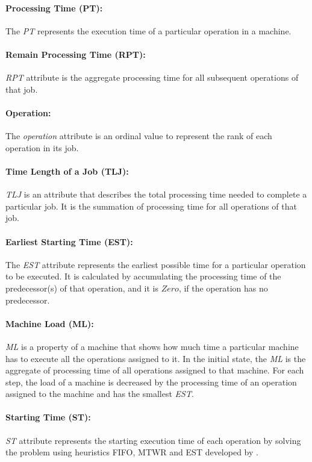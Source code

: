 \documentclass[runningheads]{llncs}
\begin{document}
\paragraph{Processing Time (PT):}
The \textit{PT} represents the execution time of a particular operation in a machine.

\paragraph{Remain Processing Time (RPT):}
\textit{RPT} attribute is the aggregate processing time for all subsequent operations of that job.

\paragraph{Operation:}
The \textit{operation} attribute is an ordinal value to represent the rank of each operation in its job.

\paragraph{Time Length of a Job (TLJ):}
\textit{TLJ} is an attribute that describes the total processing time needed to complete a particular job. It is the summation of processing time for all operations of that job.

\paragraph{Earliest Starting Time (EST):}
The \textit{EST} attribute represents the earliest possible time for a particular operation to be executed. It is calculated by accumulating the processing time of the predecessor(s) of that operation, and it is $Zero$, if the operation has no predecessor.

\paragraph{{Machine Load} (ML):}
\textit{ML} is a property of a machine that shows how much time a particular machine has to execute all the operations assigned to it. In the initial state, the \textit{ML} is the aggregate of processing time of all operations assigned to that machine. For each step, the load of a machine is decreased by the processing time of an operation assigned to the machine and has the smallest \textit{EST}.

\paragraph{{Starting Time} (ST):}
\textit{ST} attribute represents the starting execution time of each operation by solving the problem using heuristics FIFO, MTWR and EST developed by \cite{tassel2021reinforcement,el2020job}.
\end{document}

